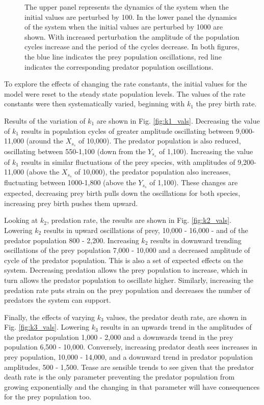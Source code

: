 \documentclass{article}
\begin{document}
\begin{figure}[H]
    \caption{The upper panel represents the dynamics of the system when the initial values are perturbed by 100. In the lower panel the dynamics of the system when the initial values are perturbed by 1000 are shown. With increased perturbation the amplitude of the population cycles increase and the period of the cycles decrease. In both figures, the blue line indicates the prey population oscillations, red line indicates the corresponding predator population oscillations.}
    \label{fig:testing_inital_vals}
\end{figure}

To explore the effects of changing the rate constants, the initial values for the model were reset to the steady state population levels. The values of the rate constants were then systematically varied, beginning with $k_1$ the prey birth rate. 

Results of the variation of $k_1$ are shown in Fig. \ref{fig:k1_vals}. Decreasing the value of $k_1$ results in population cycles of greater amplitude oscillating between 9,000-11,000 (around the $X_s_s$ of 10,000). The predator population is also reduced, oscillating between 550-1,100 (down from the $Y_s_s$ of 1,100). Increasing the value of $k_1$ results in similar fluctuations of the prey species, with amplitudes of 9,200-11,000 (above the $X_s_s$ of 10,000), the predator population also increases, fluctuating between 1000-1,800 (above the $Y_s_s$ of 1,100). These changes are expected, decreasing prey birth pulls down the oscillations for both species, increasing prey birth pushes them upward. 

Looking at $k_2$, predation rate, the results are shown in Fig. \ref{fig:k2_vals}. Lowering $k_2$ results in upward oscillations of prey, 10,000 - 16,000 - and of the predator population 800 - 2,200. Increasing $k_2$ results in downward trending oscillations of the prey population 7,000 - 10,000 and a decreased amplitude of cycle of the predator population. This is also a set of expected effects on the system. Decreasing predation allows the prey population to increase, which in turn allows the predator population to oscillate higher. Similarly, increasing the predation rate puts strain on the prey population and decreases the number of predators the system can support. 

Finally, the effects of varying $k_3$ values, the predator death rate, are shown in Fig. \ref{fig:k3_vals}. Lowering $k_3$ results in an upwards trend in the amplitudes of the predator population 1,000 - 2,000 and a downwards trend in the prey population 6,500 - 10,000. Conversely, increasing predator death sees increases in prey population, 10,000 - 14,000, and a downward trend in predator population amplitudes, 500 - 1,500. Tease are sensible trends to see given that the predator death rate is the only parameter preventing the predator population from growing exponentially and the changing in that parameter will have consequences for the prey population too.   
\end{document}
